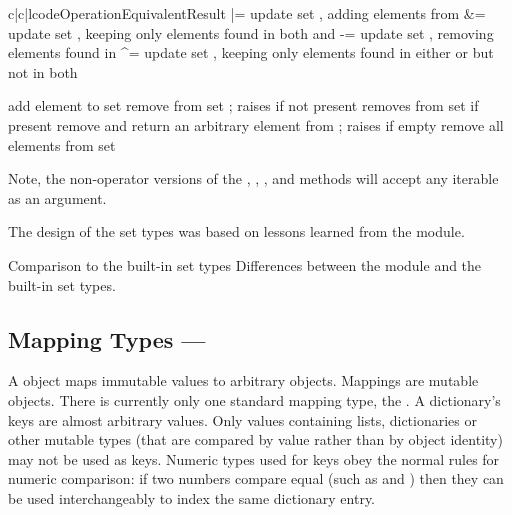 \begin{tableiii}{c|c|l}{code}{Operation}{Equivalent}{Result}
         { |= }
         {update set , adding elements from }
         { \&= }
         {update set , keeping only elements found in both  and }
         { -= }
         {update set , removing elements found in }
         { \textasciicircum= }
         {update set , keeping only elements found in either  or 
          but not in both}

  \hline
         {add element  to set }
         {remove  from set ; raises 
	  if not present}
         {removes  from set  if present}
         {remove and return an arbitrary element from ; raises
	   if empty}
         {remove all elements from set }
\end{tableiii}

Note, the non-operator versions of the ,
, , and
 methods will accept any iterable
as an argument.

The design of the set types was based on lessons learned from the
 module.
     
\begin{seealso}     
          {Comparison to the built-in set types}
          {Differences between the  module and the
           built-in set types.}					      
\end{seealso}
     

\subsection{Mapping Types ---  \label{typesmapping}}

A  object maps  immutable values to
arbitrary objects.  Mappings are mutable objects.  There is currently
only one standard mapping type, the .  A dictionary's keys are
almost arbitrary values.  Only values containing lists, dictionaries
or other mutable types (that are compared by value rather than by
object identity) may not be used as keys.
Numeric types used for keys obey the normal rules for numeric
comparison: if two numbers compare equal (such as  and
) then they can be used interchangeably to index the same
dictionary entry.

